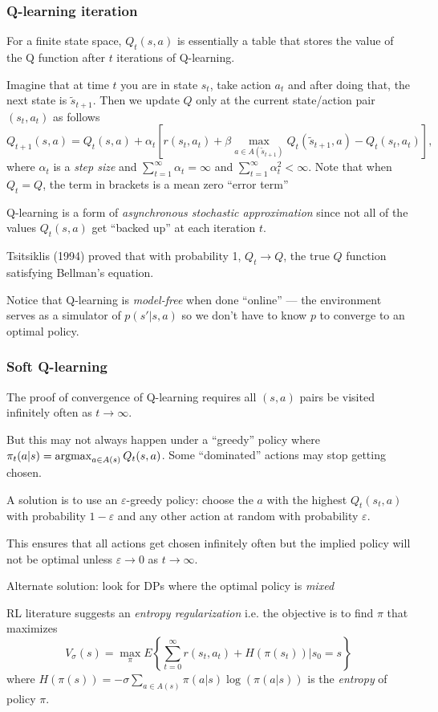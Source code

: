 \documentclass[10pt,english,t,handout]{beamer}
\def\argmax{\mathop{\rm argmax}}
\begin{document}
\begin{frame} \frametitle{Q-learning iteration}
\bi
\item For a finite state space, $Q_t(s,a)$ is essentially a table that stores the value of the Q function after
$t$ iterations of Q-learning.
\item Imagine that at time $t$ you are in state $s_t$, take action $a_t$ and after doing that, the next state is $\tilde s_{t+1}$.
Then we update $Q$ only at the current state/action pair $(s_t,a_t)$ as follows
$$  Q_{t+1}(s,a) = Q_t(s,a)+ \alpha_t \left[ r(s_t,a_t)+\beta \max_{a \in A(\tilde s_{t+1})} Q_t(\tilde s_{t+1},a)- Q_t(s_t,a_t)\right],
$$
where $\alpha_t$ is a {\it step size\/} and $\sum_{t=1}^\infty \alpha_t = \infty$ and $\sum_{t=1}^\infty \alpha_t^2 < \infty$.
Note that when $Q_t=Q$, the term in brackets is a mean zero ``error term''
\item Q-learning is a form of {\it asynchronous stochastic approximation\/} since not all of the values $Q_t(s,a)$ get ``backed up''
at each iteration $t$.
\item Tsitsiklis (1994) proved that with probability 1, $Q_t \to Q$, the true $Q$ function satisfying Bellman's equation.
\item Notice that Q-learning is {\it model-free\/} when done ``online'' --- the environment serves as a simulator
of $p(s'|s,a)$ so we don't have to know $p$ to converge to an optimal policy.
\ei
\end{frame}

\begin{frame} \frametitle{Soft Q-learning}
\bi
\item The proof of convergence of Q-learning requires all $(s,a)$ pairs be visited infinitely often as $t \to \infty$.
\item But this may not always happen under a ``greedy'' policy where $\pi_t(a|s)=\argmax_{a \in A(s)} Q_t(s,a)$. Some ``dominated''
actions may stop getting chosen.
\item A solution is to use an {$\varepsilon$-greedy\/} policy: choose the $a$ with the highest $Q_t(s_t,a)$ with probability
$1-\varepsilon$ and any other action at random with probability $\varepsilon$.
\item This ensures that all actions get chosen infinitely often but the implied policy will not be optimal
unless $\varepsilon \to 0$ as $t \to \infty$. 
\item Alternate solution: look for DPs where the optimal policy is {\it mixed\/}
\item RL literature suggests an  {\it entropy regularization\/} i.e. the objective is to find $\pi$ that maximizes
$$ V_\sigma(s) = \max_\pi E\left\{ \sum_{t=0}^\infty r(s_t,a_t)+H(\pi(s_t))\big| s_0=s \right\} $$
where $H(\pi(s))=-\sigma\sum_{a \in A(s)} \pi(a|s)\log(\pi(a|s))$ is the {\it entropy\/} of policy $\pi$. 
\ei
\end{frame}
\end{document}

